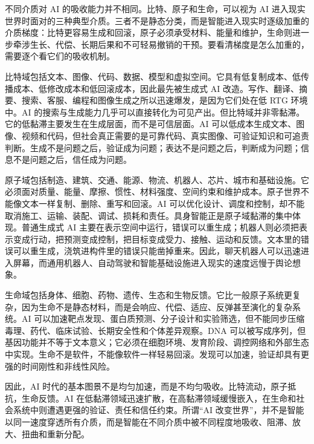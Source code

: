 
不同介质对 AI 的吸收能力并不相同。比特、原子和生命，可以视为 AI 进入现实世界时面对的三种典型介质。三者不是静态分类，而是智能进入现实时逐级加重的介质梯度：比特更容易生成和回滚，原子必须承受材料、能量和维护，生命则进一步牵涉生长、代偿、长期后果和不可轻易撤销的干预。要看清梯度是怎么加重的，需要逐个看它们的吸收机制。

比特域包括文本、图像、代码、数据、模型和虚拟空间。它具有低复制成本、低传播成本、低修改成本和低回滚成本，因此最先被生成式 AI 改造。写作、翻译、摘要、搜索、客服、编程和图像生成之所以迅速爆发，是因为它们处在低 RTG 环境中。AI 的搜索与生成能力几乎可以直接转化为可见产出。但比特域并非零黏滞。它的低黏滞主要发生在生成层面，而不是可信层面。AI 可以低成本生成文本、图像、视频和代码，但社会真正需要的是可靠代码、真实图像、可验证知识和可追责判断。生成不是问题之后，验证成为问题；表达不是问题之后，判断成为问题；信息不是问题之后，信任成为问题。

原子域包括制造、建筑、交通、能源、物流、机器人、芯片、城市和基础设施。它必须面对质量、能量、摩擦、惯性、材料强度、空间约束和维护成本。原子世界不能像文本一样复制、删除、重写和回滚。AI 可以优化设计、调度和控制，却不能取消施工、运输、装配、调试、损耗和责任。具身智能正是原子域黏滞的集中体现。普通生成式 AI 主要在表示空间中运行，错误可以重生成；机器人则必须把表示变成行动，把预测变成控制，把目标变成受力、接触、运动和反馈。文本里的错误可以重生成，浇筑进构件里的错误只能凿掉重来。因此，聊天机器人可以迅速进入屏幕，而通用机器人、自动驾驶和智能基础设施进入现实的速度远慢于舆论想象。

生命域包括身体、细胞、药物、遗传、生态和生物反馈。它比一般原子系统更复杂，因为生命不是静态材料，而是会响应、代偿、适应、反弹甚至演化的复杂系统。AI 可以加速靶点发现、蛋白质预测、分子设计和实验筛选，但不能同步压缩毒理、药代、临床试验、长期安全性和个体差异观察。DNA 可以被写成序列，但基因功能并不等于文本意义；它必须在细胞环境、发育阶段、调控网络和外部生态中实现。生命不是软件，不能像软件一样轻易回滚。发现可以加速，验证却具有更强的时间刚性和非线性风险。

因此，AI 时代的基本图景不是均匀加速，而是不均匀吸收。比特流动，原子抵抗，生命反馈。AI 在低黏滞领域迅速扩散，在高黏滞领域缓慢嵌入，在生命和社会系统中则遭遇更强的验证、责任和信任约束。所谓“AI 改变世界”，并不是智能以同一速度穿透所有介质，而是智能在不同介质中被不同程度地吸收、阻滞、放大、扭曲和重新分配。

